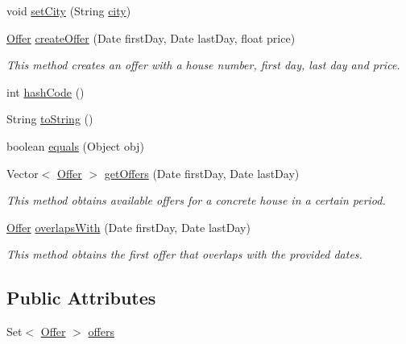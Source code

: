 \begin{DoxyCompactItemize}
\item 
void \mbox{\hyperlink{classdomain_1_1RuralHouse_a04f87e3266ab2b0d9b42bb8f947d6172}{set\+City}} (String \mbox{\hyperlink{classdomain_1_1RuralHouse_a4ac1bd1de58f97487abbcb8dc27a8077}{city}})
\item 
\mbox{\hyperlink{classdomain_1_1Offer}{Offer}} \mbox{\hyperlink{classdomain_1_1RuralHouse_a58e17e08a7b28a75bc1b8e3d6ac01764}{create\+Offer}} (Date first\+Day, Date last\+Day, float price)
\begin{DoxyCompactList}\small\item\em This method creates an offer with a house number, first day, last day and price. \end{DoxyCompactList}\item 
int \mbox{\hyperlink{classdomain_1_1RuralHouse_a23272d170821f464d6b07595303c283e}{hash\+Code}} ()
\item 
String \mbox{\hyperlink{classdomain_1_1RuralHouse_a2937650ac9e726b75be724d264fa1bee}{to\+String}} ()
\item 
boolean \mbox{\hyperlink{classdomain_1_1RuralHouse_a92f3f1fa5d605f34e95f4e4175ef2629}{equals}} (Object obj)
\item 
Vector$<$ \mbox{\hyperlink{classdomain_1_1Offer}{Offer}} $>$ \mbox{\hyperlink{classdomain_1_1RuralHouse_abe770c8a0fbcfed83a358d84bacd66f7}{get\+Offers}} (Date first\+Day, Date last\+Day)
\begin{DoxyCompactList}\small\item\em This method obtains available offers for a concrete house in a certain period. \end{DoxyCompactList}\item 
\mbox{\hyperlink{classdomain_1_1Offer}{Offer}} \mbox{\hyperlink{classdomain_1_1RuralHouse_ac5596b06728d8bf377993088520fbc9e}{overlaps\+With}} (Date first\+Day, Date last\+Day)
\begin{DoxyCompactList}\small\item\em This method obtains the first offer that overlaps with the provided dates. \end{DoxyCompactList}\end{DoxyCompactItemize}
\subsection*{Public Attributes}
\begin{DoxyCompactItemize}
\item 
Set$<$ \mbox{\hyperlink{classdomain_1_1Offer}{Offer}} $>$ \mbox{\hyperlink{classdomain_1_1RuralHouse_ab96f0810763d7df5b3f38622850f941e}{offers}}
\end{DoxyCompactItemize}
